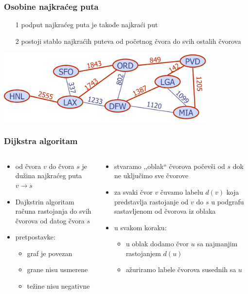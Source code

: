 \documentclass[compress,aspectratio=169]{beamer}
\begin{document}
\begin{frame}[fragile]
  \frametitle{Osobine najkraćeg puta}
  \begin{itemize}
    \item[1] podput najkraćeg puta je takođe najkraći put
    \item[2] postoji stablo najkraćih puteva od početnog čvora do svih
      ostalih čvorova
  \end{itemize}
  \begin{center}
    \includegraphics[width=11cm]{asp-14-pic60.png}
  \end{center}
\end{frame}

\begin{frame}[fragile]
  \frametitle{Dijkstra algoritam}
  \begin{columns}
    \begin{column}[t]{6cm}
      \begin{itemize}
        \item {} od čvora $v$ do čvora $s$ je dužina 
          najkraćeg puta $v \rightarrow s$
        \item Dajkstrin algoritam računa rastojanja do svih čvorova od
          datog čvora $s$
        \item pretpostavke:
        \begin{itemize}
          \item graf je povezan
          \item grane nisu usmerene
          \item težine nisu negativne
        \end{itemize}
      \end{itemize}
    \end{column}
    \begin{column}[t]{6cm}
      \begin{itemize}
        \item stvaramo ,,oblak`` čvorova počevši od $s$ dok ne uključimo
          sve čvorove
        \item za svaki čvor $v$ čuvamo labelu $d(v)$ koja predstavlja
          rastojanje od $v$ do $s$ u podgrafu sastavljenom od čvorova iz
          oblaka
        \item u svakom koraku:
        \begin{itemize}
          \item u oblak dodamo čvor $u$ sa najmanjim rastojanjem $d(u)$
          \item ažuriramo labele čvorova susednih sa $u$
        \end{itemize}
      \end{itemize}
    \end{column}
  \end{columns}
\end{frame}
\end{document}
